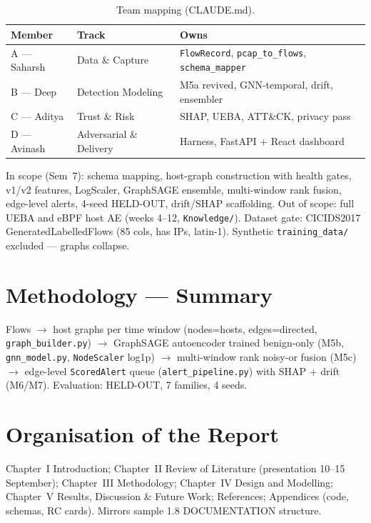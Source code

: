 \documentclass[12pt,a4paper,oneside]{report}
\newcommand{\bluetableheader}{\rowcolor{headerblue}\color{white}\bfseries}
\begin{document}
\begin{table}[H]
\centering
\caption{Team mapping (CLAUDE.md).}
\label{tab:1.2}
\begin{tabular}{|L{3.2cm}|L{3.8cm}|L{7.4cm}|}
\hline
\bluetableheader Member & Track & Owns \\ \hline
{} A — Saharsh & Data \& Capture & \texttt{FlowRecord}, \texttt{pcap\_to\_flows}, \texttt{schema\_mapper} \\ \hline
B — Deep & Detection Modeling & M5a revived, GNN-temporal, drift, ensembler \\ \hline
{} C — Aditya & Trust \& Risk & SHAP, UEBA, ATT\&CK, privacy pass \\ \hline
D — Avinash & Adversarial \& Delivery & Harness, FastAPI + React dashboard \\ \hline
\end{tabular}
\end{table}

In scope (Sem~7): schema mapping, host-graph construction with health gates, v1/v2 features, LogScaler, GraphSAGE ensemble, multi-window rank fusion, edge-level alerts, 4-seed HELD-OUT, drift/SHAP scaffolding. Out of scope: full UEBA and eBPF host AE (weeks 4--12, \texttt{Knowledge/}). Dataset gate: CICIDS2017 GeneratedLabelledFlows (85 cols, has IPs, latin-1). Synthetic \texttt{training\_data/} excluded — graphs collapse.

\section{Methodology — Summary}
Flows $\rightarrow$ host graphs per time window (nodes=hosts, edges=directed, \texttt{graph\_builder.py}) $\rightarrow$ GraphSAGE autoencoder trained benign-only (M5b, \texttt{gnn\_model.py}, \texttt{NodeScaler} log1p) $\rightarrow$ multi-window rank noisy-or fusion (M5c) $\rightarrow$ edge-level \texttt{ScoredAlert} queue (\texttt{alert\_pipeline.py}) with SHAP + drift (M6/M7). Evaluation: HELD-OUT, 7 families, 4 seeds.

\section{Organisation of the Report}
Chapter~I Introduction; Chapter~II Review of Literature (presentation 10--15 September); Chapter~III Methodology; Chapter~IV Design and Modelling; Chapter~V Results, Discussion \& Future Work; References; Appendices (code, schemas, RC cards). Mirrors sample 1.8 DOCUMENTATION structure.
\end{document}
